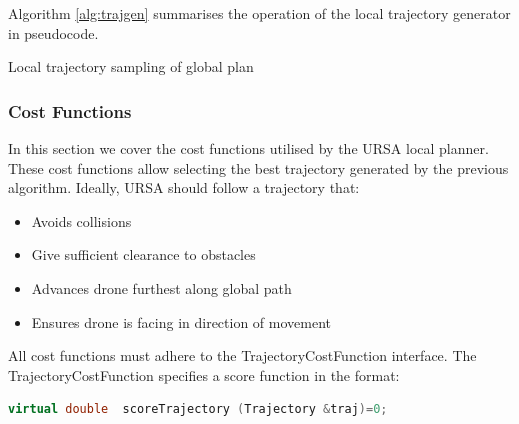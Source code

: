 \documentclass[capstone_report.tex]{subfiles}
\begin{document}
Algorithm \ref{alg:trajgen} summarises the operation of the local trajectory generator in pseudocode.\\
\begin{algorithm}[H]
\vspace{1.5mm}

\vspace{3.5mm}
\caption{Local trajectory sampling of global plan}
\label{alg:trajgen}
\end{algorithm}

\subsubsection{Cost Functions}
In this section we cover the cost functions utilised by the URSA local planner. These cost functions allow selecting the best trajectory generated by the previous algorithm. Ideally, URSA should follow a trajectory that:
\begin{itemize}
    \item Avoids collisions
    \item Give sufficient clearance to obstacles
    \item Advances drone furthest along global path
    \item Ensures drone is facing in direction of movement
\end{itemize}

All cost functions must adhere to the TrajectoryCostFunction interface. The TrajectoryCostFunction specifies a score function in the format:

\begin{lstlisting}[language=c++]
    virtual double  scoreTrajectory (Trajectory &traj)=0;
\end{lstlisting}
\end{document}
